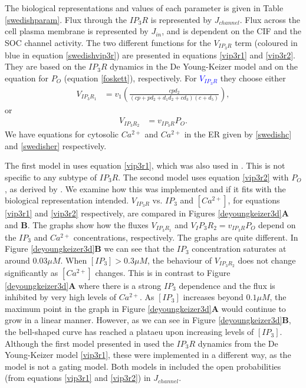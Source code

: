The biological representations and values of each parameter is given in Table \ref{swedishparam}. Flux through the $IP_3R$ is represented by $J_{channel}$. Flux across the cell plasma membrane is represented by $J_{in}$, and is dependent on the CIF and the SOC channel activity. The two different functions for the $V_{IP_3R}$ term (coloured in blue in equation \eqref{swedishvip3r}) are presented in equations \eqref{vip3r1} and \eqref{vip3r2}. They are based on the $IP_3R$ dynamics in the De Young-Keizer model and on the  equation for $P_O$ (equation \eqref{foskett}), respectively. For \textcolor{blue}{$V_{IP_3R}$} they choose either
\begin{align}
    V_{IP_3R_1}&=v_1\left(\frac{cpd_2}{(cp+pd_2+d_1d_2+cd_3)(c+d_5)}\right),\label{vip3r1}
\end{align}
or
\begin{align}
    V_{IP_3R_2}&=v_{IP_3R}P_O.\label{vip3r2}
\end{align}
We have equations for cytosolic $Ca^{2+}$ and $Ca^{2+}$ in the ER given by \eqref{swedishc} and \eqref{swedisher} respectively.

The first model in  uses equation \eqref{vip3r1}, which was also used in . This is not specific to any subtype of $IP_3R$. The second model uses equation \eqref{vip3r2} with $P_O$, as derived by . We examine how this was implemented and if it fits with the biological representation intended. $V_{IP_3R}$ vs. ${IP_3}$ and $[Ca^{2+}]$, for equations \eqref{vip3r1} and \eqref{vip3r2} respectively, are compared in Figures \ref{deyoungkeizer3d}\textbf{A} and \textbf{B}. The graphs show how the fluxes $V_{IP_3R_1}$ and ${V_IP_3R_2}=v_{IP_3R}P_O$ depend on the $IP_3$ and $Ca^{2+}$ concentrations, respectively. The graphs are quite different. In Figure \ref{deyoungkeizer3d}\textbf{B} we can see that the $IP_3$ concentration saturates at around $0.03\mu M$. When $[IP_3]>0.3 \mu M$, the behaviour of $V_{IP_3R_2}$ does not change significantly as $[Ca^{2+}]$ changes. This is in contrast to Figure \ref{deyoungkeizer3d}\textbf{A} where there is a strong $IP_3$ dependence and the flux is inhibited by very high levels of $Ca^{2+}$. {As $[IP_3]$ increases beyond $0.1\mu M$, the maximum point in the graph in Figure \ref{deyoungkeizer3d}\textbf{A} would continue to grow in a linear manner. However, as we can see in Figure \ref{deyoungkeizer3d}\textbf{B}, the bell-shaped curve has reached a plataeu upon increasing levels of $[IP_3]$.} Although the first model presented in  used the $IP_3R$ dynamics from the De Young-Keizer model \eqref{vip3r1}, these were implemented in a different way, as the  model is not a gating model. Both models in  included the open probabilities (from equations \eqref{vip3r1} and \eqref{vip3r2}) in $J_{channel}$.

